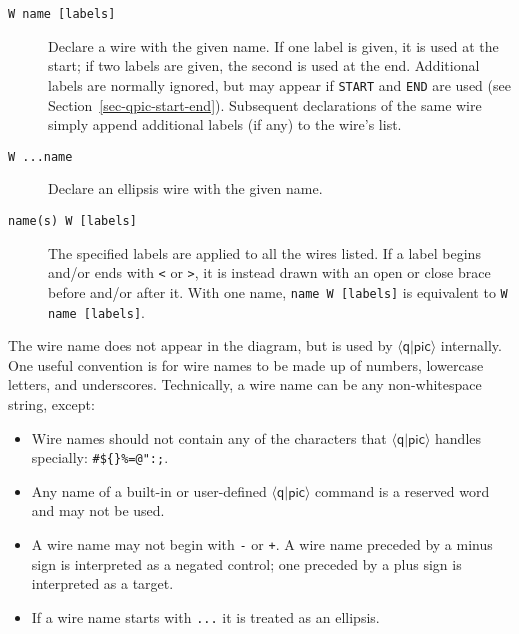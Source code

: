 \documentclass[twoside,12pt]{article}
\newcommand{\qpic}{$\langle\mathsf{q}|\mathsf{pic}\rangle$\xspace}
\begin{document}
\begin{description}
\item[{\tt W name [labels]}] Declare a wire with the given name.  If one label is
  given, it is used at the start; if two labels are given, the second is used at the
  end.  Additional labels are normally ignored, but may appear if {\tt START} and
  {\tt END} are used (see Section~\ref{sec-qpic-start-end}).  Subsequent declarations
  of the same wire simply append additional labels (if any) to the wire's list.

\begin{minipage}[b]{2in}

\end{minipage} \hfill 
\item[{\tt W ...name}] Declare an ellipsis wire with the given name.

\begin{minipage}[b]{2in}

\end{minipage} \hfill 

\item[{\tt name(s) W [labels]}] The specified labels are applied to all the wires
  listed.  If a label begins and/or ends with {\tt <} or {\tt >}, it is instead
  drawn with an open or close brace before and/or after it.  With one name,
  {\tt name W [labels]} is equivalent to {\tt W name [labels]}.
  
\begin{minipage}[b]{2.7in}

\end{minipage} \hfill 
\end{description}

The wire name does not appear in the diagram, but is used by \qpic internally.
One useful convention is for wire names to be made up of numbers, lowercase letters,
and underscores.  Technically, a wire name can be any non-whitespace string, except:
\begin{itemize}
\item Wire names should not contain any of the characters that \qpic handles specially:
{\tt {}\#\$\{\}\%=@":;}.
\item  Any name of a built-in or user-defined \qpic command is a reserved word and may not be used.
\item  A wire name may not begin with {\tt -} or {\tt +}.  A wire name preceded by a
  minus sign is interpreted as a negated control; one preceded by a plus sign is
  interpreted as a target.
\item  If a wire name starts with {\tt ...} it is treated as an ellipsis.
\end{itemize}
\end{document}
